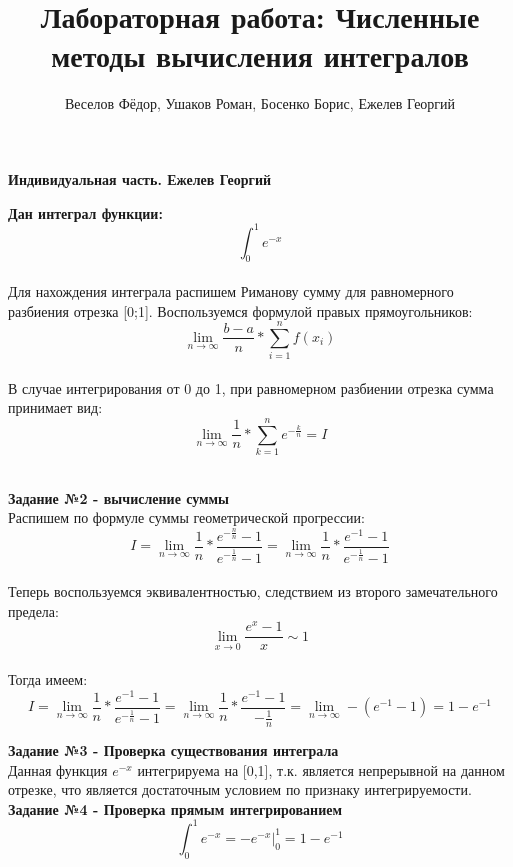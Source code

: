 \documentclass{beamer}
\title[]{Лабораторная работа: Численные методы вычисления интегралов}
\author[]{Веселов Фёдор, Ушаков Роман, Босенко Борис, Ежелев Георгий}
\begin{document}
	\begin{frame}
		\titlepage
	\end{frame}
	
	\large \textbf{\textcolor{structure.fg}{Индивидуальная часть. Ежелев Георгий}}\\
	\begin{frame}
		\textbf{Дан интеграл функции: } \[\int_{0}^{1}  e^{-x}\]\\
		Для нахождения интеграла распишем Риманову сумму для равномерного разбиения отрезка [0;1]. Воспользуемся формулой правых прямоугольников:\\
		\[\lim_{n \to \infty}\frac{b-a}{n}*\sum_{i=1}^{n}f(x_i)\]\\
		В случае интегрирования от 0 до 1, при равномерном разбиении отрезка сумма принимает вид:\\
		\[\lim_{n \to \infty} \frac{1}{n} * \sum_{k=1}^{n} e^{-\frac{k}{n}} = I\]\\
	\end{frame}
	\begin{frame}
	\large \textbf{\textcolor{structure.fg}{Задание №2 - вычисление суммы}}\\
	Распишем по формуле суммы геометрической прогрессии:\\
	\[I = \lim_{n \to \infty} \frac{1}{n} * \frac{e^{-\frac{n}{n}} - 1 }{e^{-\frac{1}{n}} - 1} = \lim_{n \to \infty} \frac{1}{n} * \frac{e^{-1} - 1 }{e^{-\frac{1}{n}} - 1}\]\\
	Теперь воспользуемся эквивалентностью, следствием из второго замечательного предела:
	\[\lim_{x \to 0} \frac{e^{x} - 1}{x} \sim 1\]\\
	Тогда имеем:
	\[I = \lim_{n \to \infty} \frac{1}{n} * \frac{e^{-1} - 1 }{e^{-\frac{1}{n}} - 1} =\lim_{n \to \infty} \frac{1}{n} * \frac{e^{-1} - 1}{-\frac{1}{n}} = \lim_{n \to \infty} -(e^{-1} - 1) = \boxed{1 - e^{-1}}\]
	\end{frame}
	\begin{frame}
		\large \textbf{\textcolor{structure.fg}{Задание №3 - Проверка существования интеграла}}\\
	Данная функция \(e^{-x}\) интегрируема на [0,1], т.к. является непрерывной на данном отрезке, что является достаточным условием по признаку интегрируемости.\\
	\large \textbf{\textcolor{structure.fg}{Задание №4 - Проверка прямым интегрированием}}\\
	\[\int_{0}^{1}  e^{-x} = -e^{-x}\Big\vert_{0}^{1} = \boxed{1 - e^{-1}}\]\\
\end{frame}
\end{document}
